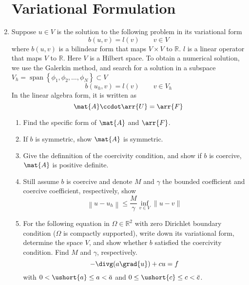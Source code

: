 \documentclass{article}
\newcommand\NoIndent[1]{%
  \begingroup
  \par
  \parshape0
  #1\par
  \endgroup
}
\DeclareMathOperator{\Span}{span}
\begin{document}
\begin{enumerate}
\NoIndent{\section{Variational Formulation}}

	\item Suppose $u \in V$ is the solution to the following problem in its variational form
		\begin{equation*}
			b(u,v) = l(v) \qquad v \in V
		\end{equation*}
		where $b(u,v)$ is a bilindear form that maps $V \times V$ to $\mathbb{R}$.
		$l$ is a linear operator that maps $V$ to $\mathbb{R}$.
		Here $V$ is a Hilbert space.
		To obtain a numerical solution, we use the Galerkin method, and search for a solution in a subspace
		$V_h = \Span\left\{\phi_1,\phi_2,\dots,\phi_N\right\} \subset V$
		\begin{equation*}
			b(u_h,v) = l(v) \qquad v \in V_h
		\end{equation*}
		In the linear algebra form, it is written as
		\begin{equation*}
			\mat{A}\ccdot\arr{U} = \arr{F}
		\end{equation*}
		\begin{enumerate}
			\item Find the specific form of $\mat{A}$ and $\arr{F}$.
			\item If $b$ is symmetric, show $\mat{A}$ is symmetric.
			\item Give the definnition of the coercivity condition,
				and show if $b$ is coercive, $\mat{A}$ is positive definite.
			\item Still assume $b$ is coercive and denote $M$ and $\gamma$ the bounded coefficient and
				coercive coefficient, respectively, show
				\begin{equation*}
					\left\|u - u_h\right\| \leq \frac{M}{\gamma}\inf_{v\in V}\|u - v\|
				\end{equation*}
			\item For the following equation in $\Omega \in \mathbb{R}^2$
				with zero Dirichlet boundary condition ($\Omega$ is compactly supported),
				write down its variational form, determine the space $V$,
				and show whether $b$ satisfied the coercivity condition.
				Find $M$ and $\gamma$, respectively.
				\begin{equation*}
					-\divg(a\grad{u}) + cu = f
				\end{equation*}
				with $0 < \ushort{a} \leq a < \bar{a}$ and $0 \leq \ushort{c} \leq c < \bar{c}$.

\end{enumerate}
\end{enumerate}
\end{document}
